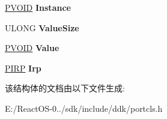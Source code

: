 \begin{DoxyCompactItemize}
\hyperlink{interfacevoid}{P\+V\+O\+ID} {\bfseries Instance}
\item 
\mbox{\label{struct___p_c_p_r_o_p_e_r_t_y___r_e_q_u_e_s_t_ad0a526a6e14d54ec2416d16868392f5d}} 
U\+L\+O\+NG {\bfseries Value\+Size}
\item 
\mbox{\label{struct___p_c_p_r_o_p_e_r_t_y___r_e_q_u_e_s_t_ab9b2b7074426831afc1e392c789ded30}} 
\hyperlink{interfacevoid}{P\+V\+O\+ID} {\bfseries Value}
\item 
\mbox{\label{struct___p_c_p_r_o_p_e_r_t_y___r_e_q_u_e_s_t_a3b5579b8f65e8155aa50cb2b5025684b}} 
\hyperlink{interfacevoid}{P\+I\+RP} {\bfseries Irp}
\end{DoxyCompactItemize}


该结构体的文档由以下文件生成\+:\begin{DoxyCompactItemize}
\item 
E\+:/\+React\+O\+S-\/0../sdk/include/ddk/portcls.\+h\end{DoxyCompactItemize}
